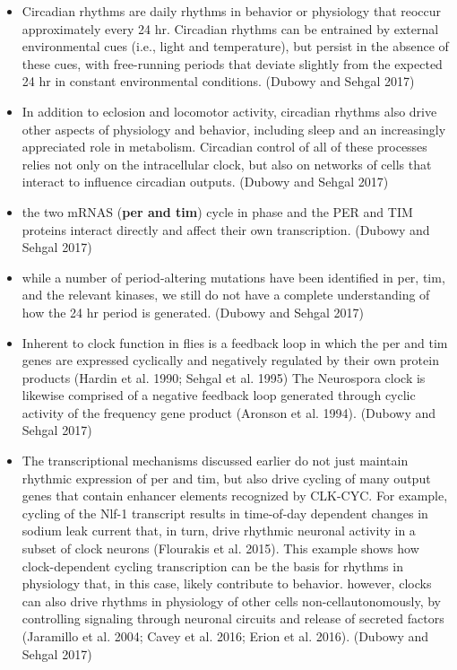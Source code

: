 \documentclass[11pt]{article}
\begin{document}
\begin{itemize}
    \item Circadian rhythms are daily rhythms in behavior or physiology that reoccur approximately
    every 24 hr. Circadian rhythms can be entrained by external environmental cues (i.e., light and
    temperature), but persist in the absence of these cues, with free-running periods that deviate
    slightly from the expected 24 hr in constant environmental conditions.
    \parencite{dubowyCircadianRhythmsSleep2017} (Dubowy and Sehgal 2017)

    \item In addition to eclosion and locomotor activity, circadian rhythms also drive other aspects
    of physiology and behavior, including sleep and an increasingly appreciated role in metabolism.
    Circadian control of all of these processes relies not only on the intracellular clock, but also
    on networks of cells that interact to influence circadian outputs.
    \parencite{dubowyCircadianRhythmsSleep2017} (Dubowy and Sehgal 2017)

    \item the two mRNAS (\textbf{per and tim}) cycle in phase and the PER and TIM proteins interact
    directly and affect their own transcription.
    \parencite{dubowyCircadianRhythmsSleep2017} (Dubowy and Sehgal 2017)

    \item while a number of period-altering mutations have been identified in per, tim, and the relevant
    kinases, we still do not have a complete understanding of how the 24 hr period is generated.
    \parencite{dubowyCircadianRhythmsSleep2017} (Dubowy and Sehgal 2017)

    \item Inherent to clock function in flies is a feedback loop in which the per and tim genes are
    expressed cyclically and negatively regulated by their own protein products (Hardin et al. 1990;
    Sehgal et al. 1995) The Neurospora clock is likewise comprised of a negative feedback loop
    generated through cyclic activity of the frequency gene product (Aronson et al. 1994).
    \parencite{dubowyCircadianRhythmsSleep2017} (Dubowy and Sehgal 2017)

    \item The transcriptional mechanisms discussed earlier do not just maintain rhythmic expression of
    per and tim, but also drive cycling of many output genes that contain enhancer elements recognized
    by CLK-CYC. For example, cycling of the Nlf-1 transcript results in time-of-day dependent
    changes in sodium leak current that, in turn, drive rhythmic neuronal activity in a subset
    of clock neurons (Flourakis et al. 2015).
    This example shows how clock-dependent cycling transcription can be the basis for rhythms in
    physiology that, in this case, likely contribute to behavior.
    however, clocks can also drive rhythms in physiology of other cells non-cellautonomously, by
    controlling signaling through neuronal circuits and release of secreted factors
    (Jaramillo et al. 2004; Cavey et al. 2016; Erion et al. 2016).
    \parencite{dubowyCircadianRhythmsSleep2017} (Dubowy and Sehgal 2017)


\end{itemize}
\end{document}
